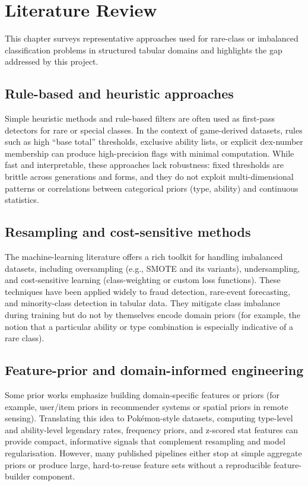 \chapter{Literature Review}

This chapter surveys representative approaches used for rare-class or imbalanced classification problems in structured tabular domains and highlights the gap addressed by this project.

\section{Rule-based and heuristic approaches}

Simple heuristic methods and rule-based filters are often used as first-pass detectors for rare or special classes. In the context of game-derived datasets, rules such as high ``base total'' thresholds, exclusive ability lists, or explicit dex-number membership can produce high-precision flags with minimal computation. While fast and interpretable, these approaches lack robustness: fixed thresholds are brittle across generations and forms, and they do not exploit multi-dimensional patterns or correlations between categorical priors (type, ability) and continuous statistics.

\section{Resampling and cost-sensitive methods}

The machine-learning literature offers a rich toolkit for handling imbalanced datasets, including oversampling (e.g., SMOTE and its variants), undersampling, and cost-sensitive learning (class-weighting or custom loss functions). These techniques have been applied widely to fraud detection, rare-event forecasting, and minority-class detection in tabular data. They mitigate class imbalance during training but do not by themselves encode domain priors (for example, the notion that a particular ability or type combination is especially indicative of a rare class).

\section{Feature-prior and domain-informed engineering}

Some prior works emphasize building domain-specific features or priors (for example, user/item priors in recommender systems or spatial priors in remote sensing). Translating this idea to Pokémon-style datasets, computing type-level and ability-level legendary rates, frequency priors, and z-scored stat features can provide compact, informative signals that complement resampling and model regularisation. However, many published pipelines either stop at simple aggregate priors or produce large, hard-to-reuse feature sets without a reproducible feature-builder component.

